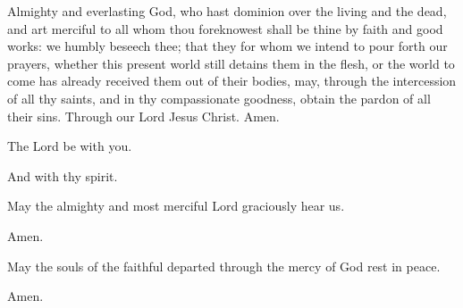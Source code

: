 {\noindent Almighty and everlasting God, who hast dominion over the living and the dead, and art merciful to all whom thou foreknowest shall be thine by faith and good works: we humbly beseech thee; that they for whom we intend to pour forth our prayers, whether this present world still detains them in the flesh, or the world to come has already received them out of their bodies, may, through the intercession of all thy saints, and in thy compassionate goodness, obtain the pardon of all their sins. Through our Lord Jesus Christ. Amen.

\noindent	\vv The Lord be with you.
	
\noindent \rr And with thy spirit.


\noindent	\vv May the almighty and most merciful Lord graciously hear us.

\noindent \rr  Amen.


\noindent \vv May the souls of the faithful departed through the mercy of God rest in peace.

\noindent \rr Amen.}